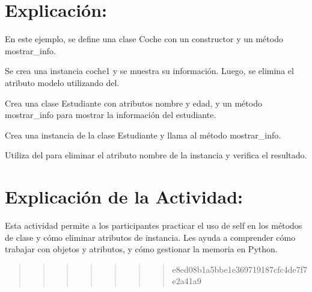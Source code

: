 \documentclass[
  a4paper,
  DIV=11,
  numbers=noendperiod,
  onepage,
  openany]{scrreprt}
\begin{document}
\hypertarget{explicaciuxf3n-55}{%
\section{Explicación:}\label{explicaciuxf3n-55}}

En este ejemplo, se define una clase Coche con un constructor y un
método mostrar\_info.

Se crea una instancia coche1 y se muestra su información. Luego, se
elimina el atributo modelo utilizando del.

\begin{tcolorbox}[enhanced jigsaw, colbacktitle=quarto-callout-important-color!10!white, toprule=.15mm, leftrule=.75mm, titlerule=0mm, opacityback=0, rightrule=.15mm, opacitybacktitle=0.6, breakable, left=2mm, coltitle=black, title=\textcolor{quarto-callout-important-color}{\faExclamation}\hspace{0.5em}{Actividad Práctica:}, toptitle=1mm, bottomtitle=1mm, arc=.35mm, bottomrule=.15mm, colback=white, colframe=quarto-callout-important-color-frame]

Crea una clase Estudiante con atributos nombre y edad, y un método
mostrar\_info para mostrar la información del estudiante.

Crea una instancia de la clase Estudiante y llama al método
mostrar\_info.

Utiliza del para eliminar el atributo nombre de la instancia y verifica
el resultado.

\end{tcolorbox}

\hypertarget{explicaciuxf3n-de-la-actividad-53}{%
\section{Explicación de la
Actividad:}\label{explicaciuxf3n-de-la-actividad-53}}

Esta actividad permite a los participantes practicar el uso de self en
los métodos de clase y cómo eliminar atributos de instancia. Les ayuda a
comprender cómo trabajar con objetos y atributos, y cómo gestionar la
memoria en Python.

\begin{quote}
\begin{quote}
\begin{quote}
\begin{quote}
\begin{quote}
\begin{quote}
\begin{quote}
e8ed08b1a5bbe1e369719187cfc4de7f7e2a41a9
\end{quote}
\end{quote}
\end{quote}
\end{quote}
\end{quote}
\end{quote}
\end{quote}
\end{document}
